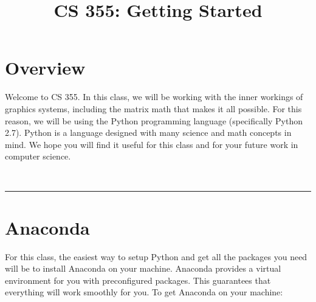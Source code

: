 \documentclass[11pt]{article}
\title{\vspace{-0.5in}CS 355: Getting Started}
\date{\vspace{-0.25in}}
\newif\ifinstructor
\begin{document}
\maketitle

\newcommand{\mat}[1]{\mathbf #1}
\renewcommand{\vec}[1]{\mathbf #1}
\newcommand{\x}{\vec{x}}
\newcommand{\y}{\vec{y}}
\newcommand{\p}{\vec{p}}
\renewcommand{\c}{\vec{c}}

\newcommand{\note}[1]{\textcolor{red}{NOTE: #1}}
\newcommand{\divider}{\bigskip ~ \hrule}

\vspace{-0.5in}

\ifinstructor
Time to complete: approximately 20 minutes
\fi

\section*{Overview}

Welcome to CS 355. In this class, we will be working with the inner workings of graphics systems, including the matrix math that makes it all possible. For this reason, we will be using the Python programming language (specifically Python 2.7). Python is a language designed with many science and math concepts in mind. We hope you will find it useful for this class and for your future work in computer science.

\divider

\section*{Anaconda}

For this class, the easiest way to setup Python and get all the packages you need will be to install Anaconda on your machine. Anaconda provides a virtual environment for you with preconfigured packages. This guarantees that everything will work smoothly for you. To get Anaconda on your machine:
\end{document}
